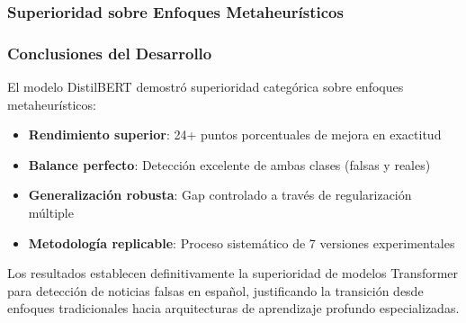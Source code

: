 \begin{table}[htbp]
\centering
{}
\caption{Métricas finales del modelo DistilBERT optimizado.}
\label{tab:metricas_finales}
\end{table}

\subsubsection{Superioridad sobre Enfoques Metaheurísticos}

\begin{table}[htbp]
\centering
{}
\caption{Comparación DistilBERT vs. mejor algoritmo metaheurístico.}
\label{tab:comparacion_final}
\end{table}

\subsubsection{Conclusiones del Desarrollo}

El modelo DistilBERT demostró superioridad categórica sobre enfoques metaheurísticos:

\begin{itemize}
    \item \textbf{Rendimiento superior}: 24+ puntos porcentuales de mejora en exactitud
    \item \textbf{Balance perfecto}: Detección excelente de ambas clases (falsas y reales)
    \item \textbf{Generalización robusta}: Gap controlado a través de regularización múltiple
    \item \textbf{Metodología replicable}: Proceso sistemático de 7 versiones experimentales
\end{itemize}

Los resultados establecen definitivamente la superioridad de modelos Transformer para detección de noticias falsas en español, justificando la transición desde enfoques tradicionales hacia arquitecturas de aprendizaje profundo especializadas.